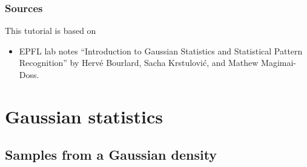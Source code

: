 \documentclass[a4paper]{article}
\begin{document}
\subsubsection*{Sources}
This tutorial is based on 

\begin{itemize}
\item EPFL lab notes 
  ``Introduction to Gaussian Statistics and Statistical Pattern
    Recognition'' by Herv\'e Bourlard, Sacha Krstulovi\'c, and Mathew
  Magimai-Doss.
\end{itemize}




\section{Gaussian statistics}

\subsection{Samples from a Gaussian density}
\label{samples}
\end{document}
